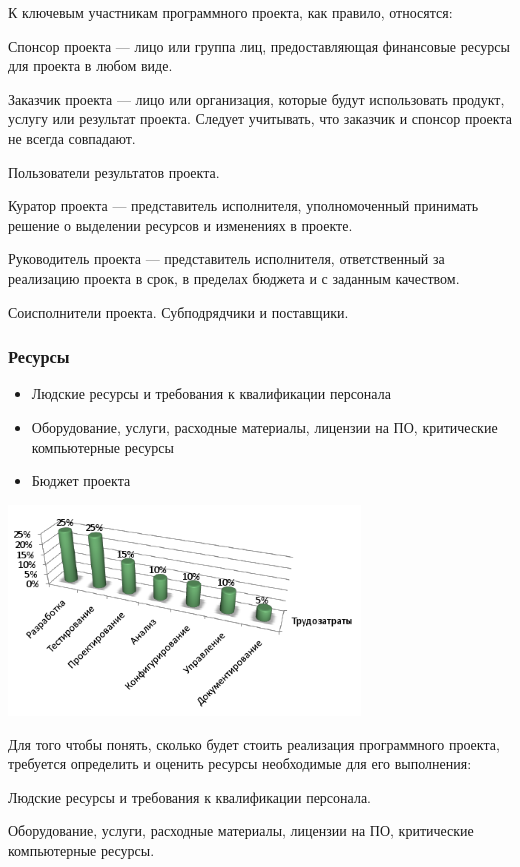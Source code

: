 \documentclass{../industrial-development}
\begin{document}
К ключевым участникам программного проекта, как правило, относятся:

Спонсор проекта — лицо или группа лиц, предоставляющая финансовые ресурсы для проекта в любом виде.

Заказчик проекта — лицо или организация, которые будут использовать продукт, услугу или результат проекта. Следует учитывать, что заказчик и спонсор проекта не всегда совпадают.

Пользователи результатов проекта.

Куратор проекта — представитель исполнителя, уполномоченный принимать решение о выделении ресурсов и изменениях в проекте.

Руководитель проекта — представитель исполнителя, ответственный за реализацию проекта в срок, в пределах бюджета и с заданным качеством.

Соисполнители проекта. Субподрядчики и поставщики.

    \begin{frame} \frametitle{Ресурсы}
	\begin{itemize}
		\item Людские ресурсы и требования к квалификации персонала
		\item Оборудование, услуги, расходные материалы, лицензии на ПО, критические компьютерные ресурсы
		\item Бюджет проекта
	\end{itemize}
         \centerline{\includegraphics[width=0.7\textwidth]{ress.png}}
    \end{frame}
    \lecturenotes

Для того чтобы понять, сколько будет стоить реализация программного проекта, требуется определить и оценить ресурсы необходимые для его выполнения:

Людские ресурсы и требования к квалификации персонала.

Оборудование, услуги, расходные материалы, лицензии на ПО, критические компьютерные ресурсы.
\end{document}
